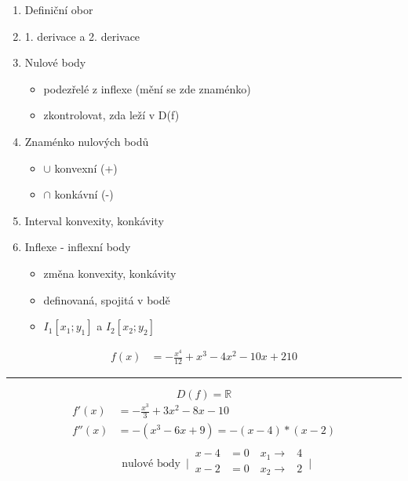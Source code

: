 \begin{enumerate}
  \item Definiční obor
  \item 1. derivace a 2. derivace
  \item Nulové body
    \begin{itemize}
      \item podezřelé z inflexe (mění se zde znaménko)
      \item zkontrolovat, zda leží v D(f)
    \end{itemize}
  \item Znaménko nulových bodů
    \begin{itemize}
      \item $\cup$ konvexní (+)
      \item $\cap$ konkávní (-)
    \end{itemize}
  \item Interval konvexity, konkávity
  \item Inflexe - inflexní body
    \begin{itemize}
      \item změna konvexity, konkávity
      \item definovaná, spojitá v bodě
      \item $I_1[x_1;y_1]$ a $I_2[x_2;y_2]$
    \end{itemize}

\end{enumerate}
\begin{align*}
  f(x)&=-\frac{x^4}{12}+x^3-4x^2-10x+210
\end{align*}
\hrule
$$D(f)=\mathbb{R}$$
\begin{align*}
  f'(x)&=-\frac{x^3}{3}+3x^2-8x-10\\
  f''(x)&=-(x^3-6x+9)=-(x-4)*(x-2)\\
  &\begin{alignedat}{2}
    \text{nulové body  }\,
    \Biggr|\,
    \begin{alignedat}{2}
      x-4 &=0 \quad x_1 \rightarrow &4 \\
      x-2 &=0 \quad x_2 \rightarrow &2 \\
    \end{alignedat}
    \,\Biggr|
  \end{alignedat}
\end{align*}

\begin{center}
\end{center}

